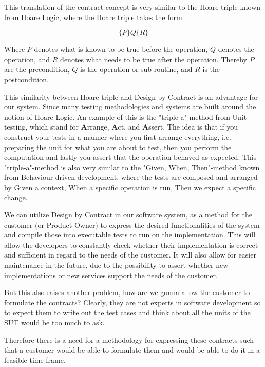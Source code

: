 This translation of the contract concept is very similar to the Hoare triple known from Hoare Logic, where the Hoare triple takes the form

\begin{equation}
\{P\} Q \{R\}
\end{equation}

Where $P$ denotes what is known to be true before the operation, $Q$ denotes the operation, and $R$ denotes what needs to be true after the operation. Thereby $P$ are the precondition, $Q$ is the operation or sub-routine, and $R$ is the postcondition. 

This similarity between Hoare triple and Design by Contract is an advantage for our system. Since many testing methodologies and systems are built around the notion of Hoare Logic. 
An example of this is the "triple-a"-method from Unit testing, which stand for \textbf{A}rrange, \textbf{A}ct, and \textbf{A}ssert.
The idea is that if you construct your tests in a manner where you first arrange everything, i.e. preparing the unit for what you are about to test, then you perform the computation and lastly you assert that the operation behaved as expected. 
This "triple-a"-method is also very similar to the "Given, When, Then"-method known from Behaviour driven development, where the tests are composed and arranged by Given a context, When a specific operation is run, Then we expect a specific change. 

We can utilize Design by Contract in our software system, as a method for the customer (or Product Owner) to express the desired functionalities of the system and compile those into executable tests to run on the implementation. 
This will allow the developers to constantly check whether their implementation is correct and sufficient in regard to the needs of the customer. 
It will also allow for easier maintenance in the future, due to the possibility to assert whether new implementations or new services support the needs of the customer.

But this also raises another problem, how are we gonna allow the customer to formulate the contracts? 
Clearly, they are not experts in software development so to expect them to write out the test cases and think about all the units of the SUT would be too much to ask.

Therefore there is a need for a methodology for expressing these contracts such that a customer would be able to formulate them and would be able to do it in a feasible time frame.
